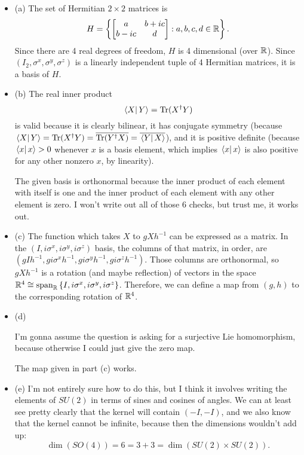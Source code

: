 \documentclass{article}
\begin{document}
\begin{itemize}
    \item (a) The set of Hermitian $2 \times 2$ matrices is
        \[ H = \left\{ \begin{bmatrix}
                a & b+ic \\
                b-ic & d
        \end{bmatrix} : a,b,c,d \in \mathbb{R} \right\}. \]
        Since there are 4 real degrees of freedom, $H$ is 4 dimensional (over $\mathbb{R}$). Since $(I_2, \sigma^x, \sigma^y, \sigma^z)$ is a linearly independent tuple of 4 Hermitian matrices, it is a basis of $H$.
    \item (b) The real inner product
        \[ \left.\left\langle X\right\vert Y \right\rangle = \operatorname{Tr} (X^\dag Y) \]
        is valid because it is clearly bilinear, it has conjugate symmetry (because $ \left.\left\langle X\right\vert Y \right\rangle = \operatorname{Tr}(X^\dag Y) = \overline{\operatorname{Tr}(Y^\dag X)} = \overline{ \left.\left\langle Y\right\vert X \right\rangle }$), and it is positive definite (because $ \left.\left\langle x\right\vert x \right\rangle >0$ whenever $x$ is a basis element, which implies $ \left.\left\langle x\right\vert x \right\rangle $ is also positive for any other nonzero $x$, by linearity).
        \par
        The given basis is orthonormal because the inner product of each element with itself is one and the inner product of each element with any other element is zero. I won't write out all of those 6 checks, but trust me, it works out.
    \item (c) The function which takes $X$ to $gXh^{-1}$ can be expressed as a matrix. In the $(I,i\sigma^x,i\sigma^y,i\sigma^z)$ basis, the columns of that matrix, in order, are $(gIh^{-1}, gi\sigma^xh^{-1}, gi\sigma^yh^{-1},gi\sigma^zh^{-1})$. Those columns are orthonormal, so $gXh^{-1}$ is a rotation (and maybe reflection) of vectors in the space $\mathbb{R}^4 \cong \operatorname{span}_{\mathbb{R}} \left\{ I, i\sigma^x, i\sigma^y, i\sigma^z \right\}$. Therefore, we can define a map from $(g,h)$ to the corresponding rotation of $\mathbb{R}^4$.
    \item (d) \begin{note}
        I'm gonna assume the question is asking for a surjective Lie homomorphism, because otherwise I could just give the zero map.
    \end{note}
    The map given in part (c) works.
\item (e) I'm not entirely sure how to do this, but I think it involves writing the elements of $SU(2)$ in terms of sines and cosines of angles. We can at least see pretty clearly that the kernel will contain $(-I,-I)$, and we also know that the kernel cannot be infinite, because then the dimensions wouldn't add up:
    \[ \dim(SO(4)) = 6 = 3+3 = \dim(SU(2) \times SU(2)). \]
    
\end{itemize}
\end{document}
